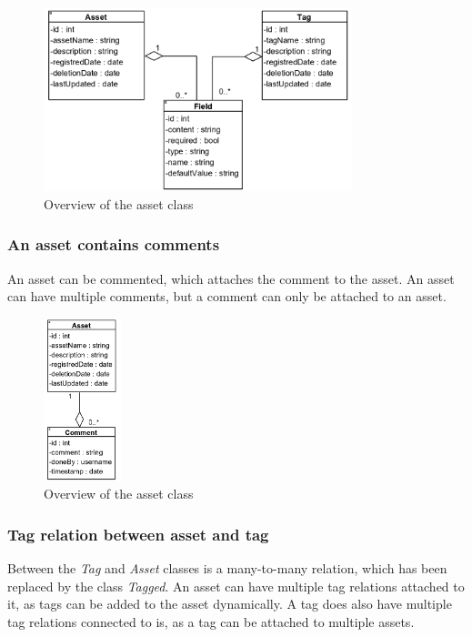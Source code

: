 \begin{figure}[H]
    \centering
    \includegraphics[width=0.8\textwidth]{figures/AssetFieldTagRelation.PNG}
    \caption{Overview of the asset class}
    \label{fig:AssetFieldTagRelation}
\end{figure}

\subsubsection{An asset contains comments}
An asset can be commented, which attaches the comment to the asset. An asset can have multiple comments, but a comment can only be attached to an asset.

\begin{figure}[H]
    \centering
    \includegraphics[width=0.2\textwidth]{figures/AssetCommentRelation.PNG}
    \caption{Overview of the asset class}
    \label{fig:AssetCommentRelation}
\end{figure}

\subsubsection{Tag relation between asset and tag}
Between the \textit{Tag} and \textit{Asset} classes is a many-to-many relation, which has been replaced by the class \textit{Tagged}. An asset can have multiple tag relations attached to it, as tags can be added to the asset dynamically. A tag does also have multiple tag relations connected to is, as a tag can be attached to multiple assets.

